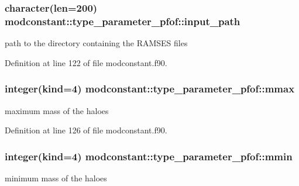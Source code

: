 \subsubsection[{\texorpdfstring{input\+\_\+path}{input_path}}]{\setlength{\rightskip}{0pt plus 5cm}character(len=200) modconstant\+::type\+\_\+parameter\+\_\+pfof\+::input\+\_\+path}\hypertarget{structmodconstant_1_1type__parameter__pfof_a4ec6b9cf9beb861220a74b20d513dc99}{}\label{structmodconstant_1_1type__parameter__pfof_a4ec6b9cf9beb861220a74b20d513dc99}


path to the directory containing the R\+A\+M\+S\+ES files 



Definition at line 122 of file modconstant.\+f90.

\subsubsection[{\texorpdfstring{mmax}{mmax}}]{\setlength{\rightskip}{0pt plus 5cm}integer(kind=4) modconstant\+::type\+\_\+parameter\+\_\+pfof\+::mmax}\hypertarget{structmodconstant_1_1type__parameter__pfof_a1140f2035cbceedd46862b69e347edf2}{}\label{structmodconstant_1_1type__parameter__pfof_a1140f2035cbceedd46862b69e347edf2}


maximum mass of the haloes 



Definition at line 126 of file modconstant.\+f90.

\subsubsection[{\texorpdfstring{mmin}{mmin}}]{\setlength{\rightskip}{0pt plus 5cm}integer(kind=4) modconstant\+::type\+\_\+parameter\+\_\+pfof\+::mmin}\hypertarget{structmodconstant_1_1type__parameter__pfof_ac284b2b966517e18568a1410337b8bc5}{}\label{structmodconstant_1_1type__parameter__pfof_ac284b2b966517e18568a1410337b8bc5}


minimum mass of the haloes 



